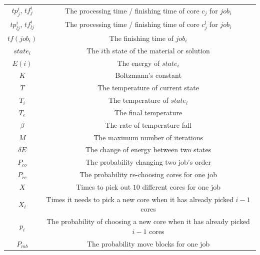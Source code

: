 \documentclass{llncs}
\begin{document}
\begin{appendices}
\begin{table}[H]
\begin{center}
\begin{tabular}{c|c}
					$tp^i_j$, $tf^i_{j}$ & The processing time / finishing time of core $c_j$ for $job_i$\\
					$tp^i_{lj}$, $tf^i_{lj}$ & The processing time / finishing time of core $c^l_j$ for $job_i$\\
					$tf(job_i)$ & The finishing time of $job_i$ \\
					$state_i$ & The $i$th state of the material or solution \\
					$E(i)$ & The energy of $state_i$ \\
					$K$ & Boltzmann's constant \\
					$T$ & The temperature of current state \\
					$T_i$ & The temperature of $state_i$ \\
					$T_e$ & The final temperature \\
					$\beta$ & The rate of temperature fall \\
					$M$ & The maximum number of iterations \\
					$\delta E$ & The change of energy between two states \\
					$P_{co}$ & The probability changing two job's order \\
					$P_{rc}$ & The probability re-choosing cores for one job \\
					$X$ & Times to pick out $10$ different cores for one job \\
					$X_i$ & Times it needs to pick a new core when it has already picked $i-1$ cores \\
					$p_i$ & The probability of choosing a new core when it has already picked $i-1$ cores \\
					$P_{mb}$ & The probability move blocks for one job \\
					
					\bottomrule
				\end{tabular}
				\label{tabSYMBOLS}
			\end{center}
		\end{table}
		

\end{appendices}
\end{document}
